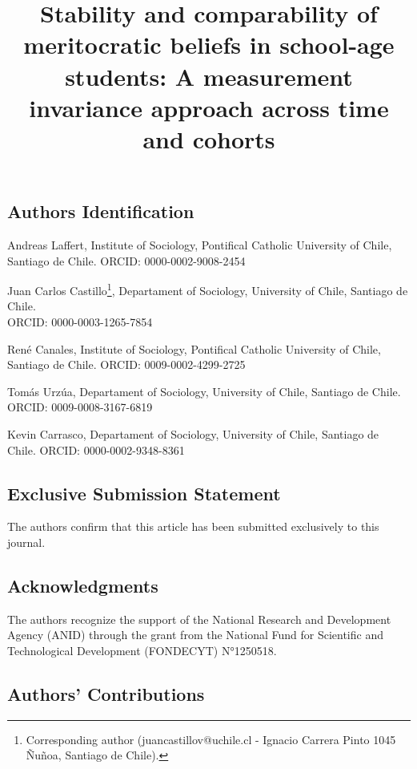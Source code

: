 \documentclass[
  12pt,
  letterpaper,
  DIV=11,
  numbers=noendperiod]{scrartcl}
\title{Stability and comparability of meritocratic beliefs in school-age
students: A measurement invariance approach across time and cohorts}
\author{}
\date{}
\begin{document}
\maketitle


\subsection{Authors Identification}\label{authors-identification}

Andreas Laffert, Institute of Sociology, Pontifical Catholic University
of Chile, Santiago de Chile. ORCID: 0000-0002-9008-2454

Juan Carlos Castillo\footnote{Corresponding author
  (juancastillov@uchile.cl - Ignacio Carrera Pinto 1045 Ñuñoa, Santiago
  de Chile).}, Departament of Sociology, University of Chile, Santiago
de Chile.\\
ORCID: 0000-0003-1265-7854

René Canales, Institute of Sociology, Pontifical Catholic University of
Chile, Santiago de Chile. ORCID: 0009-0002-4299-2725

Tomás Urzúa, Departament of Sociology, University of Chile, Santiago de
Chile. ORCID: 0009-0008-3167-6819

Kevin Carrasco, Departament of Sociology, University of Chile, Santiago
de Chile. ORCID: 0000-0002-9348-8361

\subsection{Exclusive Submission
Statement}\label{exclusive-submission-statement}

The authors confirm that this article has been submitted exclusively to
this journal.

\subsection{Acknowledgments}\label{acknowledgments}

The authors recognize the support of the National Research and
Development Agency (ANID) through the grant from the National Fund for
Scientific and Technological Development (FONDECYT) N°1250518.

\subsection{Authors' Contributions}\label{authors-contributions}
\end{document}
